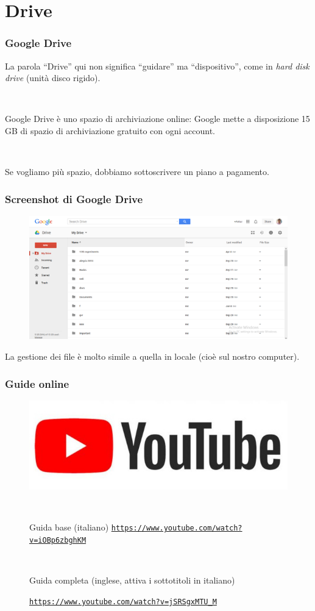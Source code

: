 \documentclass[handout]{beamer}
\begin{document}
\section{Drive}



\begin{frame}
\frametitle{Google Drive}
La parola ``Drive'' qui non significa ``guidare'' ma ``dispositivo'', come in \emph{hard disk drive} (unità disco rigido).\pause

~

Google Drive è uno \alert{spazio di archiviazione online}: Google mette a disposizione 15 GB di spazio di archiviazione gratuito con ogni account.\pause

~

Se vogliamo più spazio, dobbiamo sottoscrivere un piano a pagamento.
\end{frame}

\begin{frame}
\frametitle{Screenshot di Google Drive}
\begin{figure}
  \includegraphics[width=\columnwidth]{img/drivescreen.png}
\end{figure}

La gestione dei file è molto simile a quella in locale (cioè sul nostro computer).
\end{frame}


\begin{frame}
\frametitle{Guide online}
\begin{figure}
\includegraphics[width=.5\columnwidth]{img/ytlogo.jpg}

~

Guida base (italiano)
\href{https://www.youtube.com/watch?v=iOBp6zbghKM}{\texttt{https://www.youtube.com/watch?v=iOBp6zbghKM}}

~

Guida completa (inglese, attiva i sottotitoli in italiano)

\href{https://www.youtube.com/watch?v=jSRSgxMTU_M}{\texttt{https://www.youtube.com/watch?v=jSRSgxMTU\_M}}
\end{figure}
\end{frame}
\end{document}
